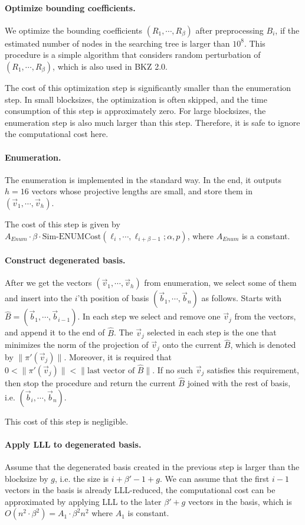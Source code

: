\documentclass[11pt]{article}
\newcommand{\vb}{\vec{b}}
\newcommand{\vv}{\vec{v}}
\newcommand{\SimENUMCost}{\mathrm{Sim}\text{-}\mathrm{ENUMCost}}
\begin{document}
\paragraph{Optimize bounding coefficients.}
We optimize the bounding coefficients $(R_1,\cdots,R_{\beta})$ after preprocessing $B_i$, if the estimated number of nodes in the searching tree is larger than $10^8$.
This procedure is a simple algorithm that considers random perturbation of $(R_1,\cdots,R_{\beta})$, which is also used in BKZ 2.0.

The cost of this optimization step is significantly smaller than the enumeration step.
In small blocksizes, the optimization is often skipped, and the time consumption of this step is approximately zero.
For large blocksizes, the enumeration step is also much larger than this step.
Therefore, it is safe to ignore the computational cost here.

\paragraph{Enumeration.}
The enumeration is implemented in the standard way.
In the end, it outputs $h=16$ vectors whose projective lengths are small, and store them in $(\vv_1,\cdots,\vv_h)$.

The cost of this step is given by $A_{Enum}\cdot\beta\cdot\SimENUMCost(\ell_i,\cdots,\ell_{i+\beta-1};\alpha,p)$, where $A_{Enum}$ is a constant.

\paragraph{Construct degenerated basis.}
After we get the vectors $(\vv_1,\cdots,\vv_h)$ from enumeration, we select some of them and insert into the $i$'th position of basis $(\vb_1,\cdots,\vb_n)$ as follows.
Starts with $\hat{B}=(\vb_1,\cdots,\vb_{i-1})$.
In each step we select and remove one $\vv_j$ from the vectors, and append it to the end of $\hat{B}$.
The $\vv_j$ selected in each step is the one that minimizes the norm of the projection of $\vv_j$ onto the current $\hat{B}$, which is denoted by $\|\pi'(\vv_j)\|$.
Moreover, it is required that $0<\|\pi'(\vv_j)\|<\|\text{last vector of } \hat{B}\|$.
If no such $\vv_j$ satisfies this requirement, then stop the procedure and return the current $\hat{B}$ joined with the rest of basis, i.e. $(\vb_i,\cdots,\vb_n)$.

This cost of this step is negligible.

\paragraph{Apply LLL to degenerated basis.}
Assume that the degenerated basis created in the previous step is larger than the blocksize by $g$, i.e. the size is $i+\beta'-1+g$.
We can assume that the first $i-1$ vectors in the basis is already LLL-reduced, the computational cost can be approximated by applying LLL to the later $\beta'+g$ vectors in the basis, which is $O(n^2\cdot\beta^2)=A_1\cdot\beta^2 n^2$ where $A_1$ is constant.
\end{document}
